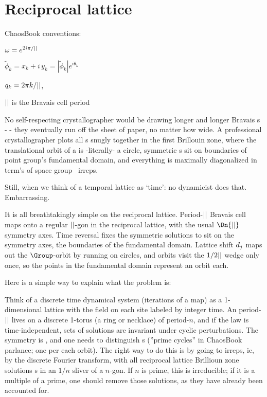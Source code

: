 

\section{Reciprocal lattice}
\label{sect:LC21recip1d} %

ChaosBook conventions:
\renewcommand{\cssp}{\ensuremath{\tilde{\phi}}}                %

$\omega = e^{2i\pi/{||}}$

$\cssp_k=x_k+i\,y_k = |\cssp_k| e^{i\theta_k}$

$q_k=2\pi{k}/{||}$,

${||}$ is the Bravais cell period

\bigskip

No self-respecting crystallographer would be drawing longer and longer
Bravais {\lattstate}s - - they
eventually run off the sheet of paper, no matter how wide.
A professional crystallographer plots all {\lattstate}s snugly together
in the first Brillouin zone, where the translational orbit of a
{\lattstate} is -literally- a circle, symmetric  {\lattstate}s sit on
boundaries of point group's fundamental domain, and everything is
maximally diagonalized in term's of space group \Group\ irreps.

Still, when we think of a temporal lattice as `time': no dynamicist does
that. Embarrassing.

It is all breathtakingly simple on the reciprocal lattice. Period-${||}$
Bravais cell maps onto a regular ${||}$-gon in the reciprocal lattice,
with the usual $\Dn{\cl{}}$ symmetry axes. Time reversal fixes
the symmetric solutions to sit on the symmetry
axes, the boundaries of the fundamental domain.
Lattice shift $d_j$ maps out the $\Group$-orbit by running on
circles, and orbits visit the $1/2{||}$ wedge only once, so the points
in the fundamental domain represent an orbit each.


Here is a simple way to explain what the problem is:

Think of a discrete time dynamical system (iterations of a map) as a
1-dimensional lattice with the field on each site labeled by integer
time. An period-${||}$ {\lattstate} lives on a discrete 1-torus (a ring or
necklace) of period-$n$, and if the law is time-independent, sets of
solutions are invariant under cyclic perturbations. The symmetry is
, and one needs to distinguish  {\orbit}s (''prime cycles'' in
ChaosBook parlance; one per each orbit). The right way to do this is by going to
 irreps, ie, by the discrete Fourier transform, with all reciprocal
lattice Brillioun zone solutions {\orbit}s in an $1/n$ sliver of a
$n$-gon. If $n$ is prime, this is irreducible; if it is a multiple of a
prime, one should remove those solutions, as they have already been
accounted for.

